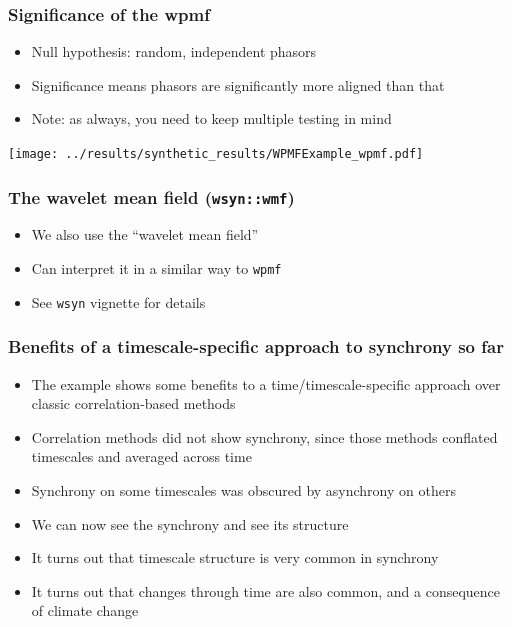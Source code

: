 \documentclass{beamer}
\begin{document}
\begin{frame}
\frametitle{Significance of the wpmf}
\begin{itemize}
\item Null hypothesis: random, independent phasors
\item Significance means phasors are significantly more aligned than that
\item Note: as always, you need to keep multiple testing in mind
\end{itemize}
\begin{center}
\texttt{[image: ../results/synthetic\_results/WPMFExample\_wpmf.pdf]}
\end{center}
\end{frame}

\begin{frame}
\frametitle{The wavelet mean field (\texttt{wsyn::wmf})}
  \begin{itemize}
    \item We also use the ``wavelet mean field'' %
    \item Can interpret it in a similar way to \texttt{wpmf}
    \item See \texttt{wsyn} vignette for details %
  \end{itemize}
\end{frame}

{
\begin{frame}
\frametitle{Benefits of a timescale-specific approach to synchrony so far}
\begin{itemize}
\item The example shows some benefits to a time/timescale-specific approach over classic correlation-based methods
\item Correlation methods did not show synchrony, since those methods conflated timescales and averaged across time
\item Synchrony on some timescales was obscured by asynchrony on others
\item We can now see the synchrony and see its structure
\item It turns out that timescale structure is very common in synchrony
\item It turns out that changes through time are also common, and a consequence of climate change
\end{itemize}
\end{frame}}
\end{document}
